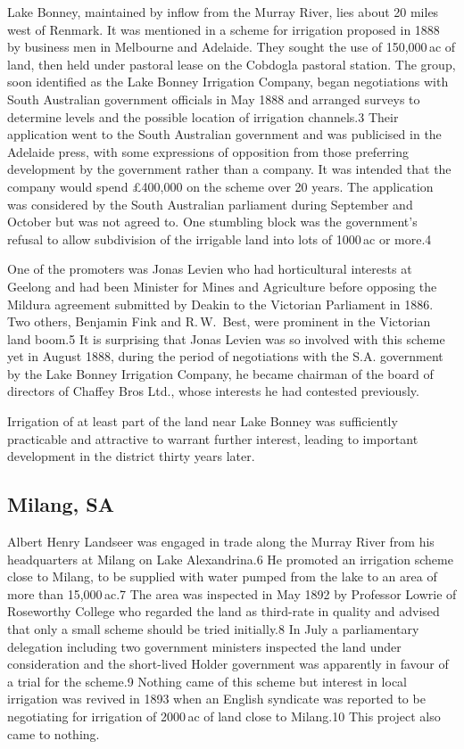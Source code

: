 Lake Bonney, maintained by inflow from the Murray River, lies about 20
miles west of Renmark.  It was mentioned in a scheme for irrigation
proposed in 1888 by business men in Melbourne and Adelaide. They
sought the use of 150,000\,ac of land, then held under pastoral lease
on the Cobdogla pastoral station.  The group, soon identified as the
Lake Bonney Irrigation Company, began negotiations with South
Australian government officials in May 1888 and arranged surveys to
determine levels and the possible location of irrigation channels.3
Their application went to the South Australian government and was
publicised in the Adelaide press, with some expressions of opposition
from those preferring development by the government rather than a
company. It was intended that the company would spend \pounds400,000
on the scheme over 20 years.  The application was considered by the
South Australian parliament during September and October but was not
agreed to.  One stumbling block was the government's refusal to allow
subdivision of the irrigable land into lots of 1000\,ac or more.4

One of the promoters was Jonas Levien who had horticultural interests
at Geelong and had been Minister for Mines and Agriculture before
opposing the Mildura agreement submitted by Deakin to the Victorian
Parliament in 1886.  Two others, Benjamin Fink and R.\,W.~Best, were
prominent in the Victorian land boom.5 It is surprising that Jonas
Levien was so involved with this scheme yet in August 1888, during the
period of negotiations with the S.A. government by the Lake Bonney
Irrigation Company, he became chairman of the board of directors of
Chaffey Bros Ltd., whose interests he had contested previously.

Irrigation of at least part of the land near Lake Bonney was
sufficiently practicable and attractive to warrant further interest,
leading to important development in the district thirty years later.

\subsection{Milang, SA}

Albert Henry Landseer was engaged in trade along the Murray River from
his headquarters at Milang on Lake Alexandrina.6 He promoted an
irrigation scheme close to Milang, to be supplied with water pumped
from the lake to an area of more than 15,000\,ac.7 The area was
inspected in May 1892 by Professor Lowrie of Roseworthy College who
regarded the land as third-rate in quality and advised that only a
small scheme should be tried initially.8 In July a parliamentary
delegation including two government ministers inspected the land under
consideration and the short-lived Holder government was apparently in
favour of a trial for the scheme.9 Nothing came of this scheme but
interest in local irrigation was revived in 1893 when an English
syndicate was reported to be negotiating for irrigation of 2000\,ac of
land close to Milang.10 This project also came to nothing.

